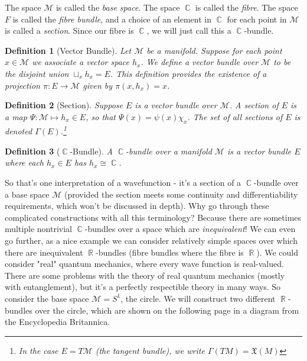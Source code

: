 \documentclass{article}
\DeclareMathOperator{\RR}{\mathbb{R}}
\DeclareMathOperator{\CC}{\mathbb{C}}
\newtheorem{defn}{Definition}
\begin{document}
The space $\mathcal{M}$ is called the \textit{base space}. The space $\CC$ is called the \textit{fibre}. The space $F$ is called the \textit{fibre bundle}, and a choice of an element in $\CC$ for each point in $\mathcal{M}$ is called a \textit{section}. Since our fibre is $\CC$, we will just call this a $\CC$-bundle.

\begin{defn}[Vector Bundle]
Let $\mathcal{M}$ be a manifold. Suppose for each point $x \in \mathcal{M}$ we associate a vector space $h_x$. We define a vector bundle over $\mathcal{M}$ to be the disjoint union $\sqcup_x h_x = E$. This definition provides the existence of a projection $\pi : E \to \mathcal{M}$ given by $\pi(x,h_x)=x$.
\end{defn}


\begin{defn}[Section]
	Suppose $E$ is a vector bundle over $\mathcal{M}$. A section of $E$ is a map $\Psi : \mathcal{M} \mapsto h_x \in E$, so that $\Psi(x) = \psi(x)\chi_x$. The set of all sections of $E$ is denoted $\Gamma(E)$.\footnote{In the case $E=T\mathcal{M}$ (the tangent bundle), we write $\Gamma(TM) = \mathfrak{X}(M)$}
\end{defn}

\begin{defn}[$\CC$-Bundle]
	A $\CC$-bundle over a manifold $\mathcal{M}$ is a vector bundle $E$ where each $h_x \in E$ has $h_x \cong \CC$.
\end{defn}

So that's one interpretation of a wavefunction - it's a section of a $\CC$-bundle over a base space $\mathcal{M}$ (provided the section meets some continuity and differentiability requirements, which won't be discussed in depth). Why go through these complicated constructions with all this terminology? Because there are sometimes multiple nontrivial $\CC$-bundles over a space which are \textit{inequivalent}! We can even go further, as a nice example we can consider relatively simple spaces over which there are inequivalent $\RR$-bundles (fibre bundles where the fibre is $\RR$). We could consider "real" quantum mechanics, where every wave function is real-valued. There are some problems with the theory of real quantum mechanics (mostly with entanglement), but it's a perfectly respectible theory in many ways. So consider the base space $\mathcal{M} = S^1$, the circle. We will construct two different $\RR$-bundles over the circle, which are shown on the following page in a diagram from the Encyclopedia Britannica.
\end{document}
